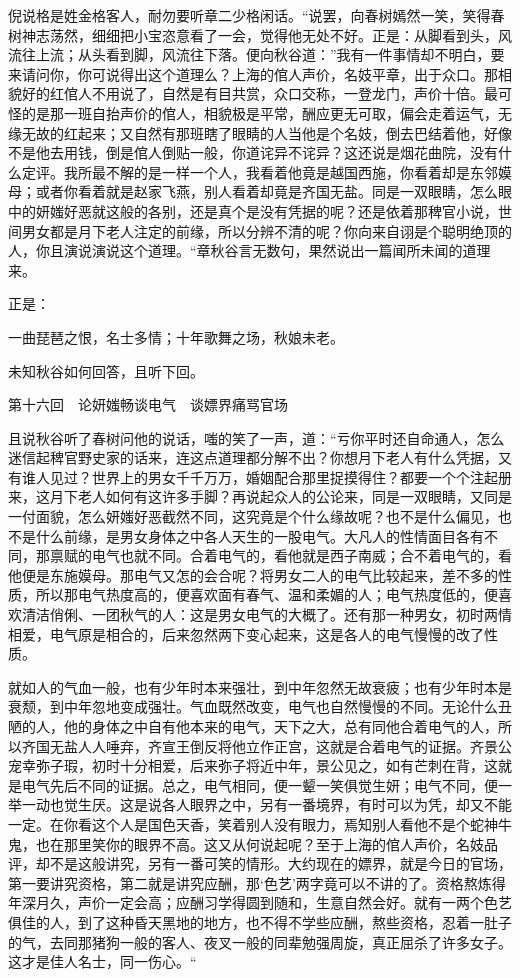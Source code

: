 \documentclass[12pt,UTF8]{ctexbook}
\begin{document}
{{{倪说格是姓金格客人，耐勿要听章二少格闲话。“说罢，向春树嫣然一笑，笑得春树神志荡然，细细把小宝恣意看了一会，觉得他无处不好。正是：从脚看到头，风流往上流；从头看到脚，风流往下落。便向秋谷道：”我有一件事情却不明白，要来请问你，你可说得出这个道理么？上海的倌人声价，名妓平章，出于众口。那相貌好的红倌人不用说了，自然是有目共赏，众口交称，一登龙门，声价十倍。最可怪的是那一班自抬声价的倌人，相貌极是平常，酬应更无可取，偏会走着运气，无缘无故的红起来；又自然有那班瞎了眼睛的人当他是个名妓，倒去巴结着他，好像不是他去用钱，倒是倌人倒贴一般，你道诧异不诧异？这还说是烟花曲院，没有什么定评。我所最不解的是一样一个人，我看着他竟是越国西施，你看着却是东邻嫫母；或者你看着就是赵家飞燕，别人看着却竟是齐国无盐。同是一双眼睛，怎么眼中的妍媸好恶就这般的各别，还是真个是没有凭据的呢？还是依着那稗官小说，世间男女都是月下老人注定的前缘，所以分辨不清的呢？你向来自诩是个聪明绝顶的人，你且演说演说这个道理。“章秋谷言无数句，果然说出一篇闻所未闻的道理来。

正是：

一曲琵琶之恨，名士多情；十年歌舞之场，秋娘未老。

未知秋谷如何回答，且听下回。





第十六回　论妍媸畅谈电气　谈嫖界痛骂官场





且说秋谷听了春树问他的说话，嗤的笑了一声，道：“亏你平时还自命通人，怎么迷信起稗官野史家的话来，连这点道理都分解不出？你想月下老人有什么凭据，又有谁人见过？世界上的男女千千万万，婚姻配合那里捉摸得住？都要一个个注起册来，这月下老人如何有这许多手脚？再说起众人的公论来，同是一双眼睛，又同是一付面貌，怎么妍媸好恶截然不同，这究竟是个什么缘故呢？也不是什么偏见，也不是什么前缘，是男女身体之中各人天生的一股电气。大凡人的性情面目各有不同，那禀赋的电气也就不同。合着电气的，看他就是西子南威；合不着电气的，看他便是东施嫫母。那电气又怎的会合呢？将男女二人的电气比较起来，差不多的性质，所以那电气热度高的，便喜欢面有春气、温和柔媚的人；电气热度低的，便喜欢清洁俏俐、一团秋气的人：这是男女电气的大概了。还有那一种男女，初时两情相爱，电气原是相合的，后来忽然两下变心起来，这是各人的电气慢慢的改了性质。

就如人的气血一般，也有少年时本来强壮，到中年忽然无故衰疲；也有少年时本是衰颓，到中年忽地变成强壮。气血既然改变，电气也自然慢慢的不同。无论什么丑陋的人，他的身体之中自有他本来的电气，天下之大，总有同他合着电气的人，所以齐国无盐人人唾弃，齐宣王倒反将他立作正宫，这就是合着电气的证据。齐景公宠幸弥子瑕，初时十分相爱，后来弥子将近中年，景公见之，如有芒刺在背，这就是电气先后不同的证据。总之，电气相同，便一颦一笑俱觉生妍；电气不同，便一举一动也觉生厌。这是说各人眼界之中，另有一番境界，有时可以为凭，却又不能一定。在你看这个人是国色天香，笑着别人没有眼力，焉知别人看他不是个蛇神牛鬼，也在那里笑你的眼界不高。这又从何说起呢？至于上海的倌人声价，名妓品评，却不是这般讲究，另有一番可笑的情形。大约现在的嫖界，就是今日的官场，第一要讲究资格，第二就是讲究应酬，那‘色艺’两字竟可以不讲的了。资格熬炼得年深月久，声价一定会高；应酬习学得圆到随和，生意自然会好。就有一两个色艺俱佳的人，到了这种昏天黑地的地方，也不得不学些应酬，熬些资格，忍着一肚子的气，去同那猪狗一般的客人、夜叉一般的同辈勉强周旋，真正屈杀了许多女子。这才是佳人名士，同一伤心。“

}}}
\end{document}
